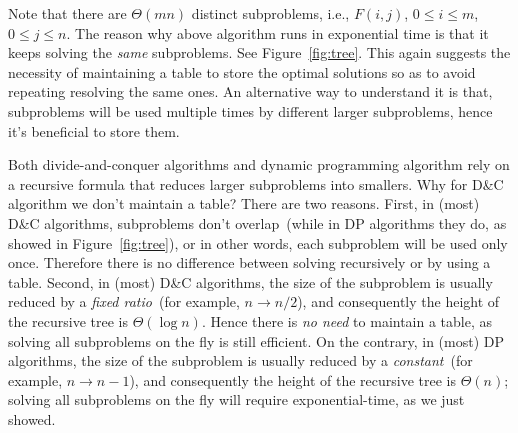 \documentclass[letterpaper,11pt]{article}
\theoremstyle{mytheorem}
\begin{document}
Note that there are $\Theta(mn)$ distinct subproblems, i.e., $F(i,j)$, $0\le i
\le m$, $0\le j \le n$. The reason why above
algorithm runs in exponential time is that it keeps solving the \emph{same}
subproblems. See Figure~\ref{fig:tree}. This again suggests the necessity
of maintaining a table to store the optimal solutions so as to avoid
repeating resolving the same ones.
An alternative way to understand it is that, subproblems will be used
multiple times by different larger subproblems, hence it's beneficial
to store them.


Both divide-and-conquer algorithms and dynamic programming algorithm
rely on a recursive formula that reduces larger subproblems into smallers.
Why for D\&C algorithm we don't maintain a table?
There are two reasons.
First, in (most) D\&C algorithms, subproblems don't overlap~(while in DP algorithms they do, as showed in Figure~\ref{fig:tree}), or in other words,
each subproblem will be used only once. Therefore there is no difference between
solving recursively or by using a table.
Second, in (most) D\&C algorithms, the size of the subproblem is usually reduced by a \emph{fixed ratio}~(for example, $n\to n/2$),
and consequently the height of the recursive tree is $\Theta(\log n)$. 
Hence there is \emph{no need} to maintain a table, as solving all subproblems on the fly is still efficient.
On the contrary, in (most) DP algorithms, the size of the subproblem is usually reduced by a \emph{constant}~(for example, $n\to n-1$),
and consequently the height of the recursive tree is $\Theta(n)$;
solving all subproblems on the fly will require exponential-time, as we just showed.
\end{document}
